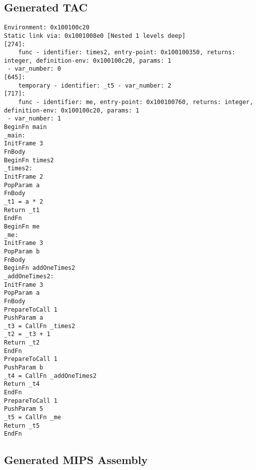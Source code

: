 \subsection{Generated TAC}
\begin{verbatim}
Environment: 0x100100c20
Static link via: 0x1001008e0 [Nested 1 levels deep]
[274]:
	func - identifier: times2, entry-point: 0x100100350, returns: integer, definition-env: 0x100100c20, params: 1
 - var_number: 0
[645]:
	temporary - identifier: _t5 - var_number: 2
[717]:
	func - identifier: me, entry-point: 0x100100760, returns: integer, definition-env: 0x100100c20, params: 1
 - var_number: 1
BeginFn main
_main:
InitFrame 3
FnBody
BeginFn times2
_times2:
InitFrame 2
PopParam a
FnBody
_t1 = a * 2
Return _t1
EndFn
BeginFn me
_me:
InitFrame 3
PopParam b
FnBody
BeginFn addOneTimes2
_addOneTimes2:
InitFrame 3
PopParam a
FnBody
PrepareToCall 1
PushParam a
_t3 = CallFn _times2
_t2 = _t3 + 1
Return _t2
EndFn
PrepareToCall 1
PushParam b
_t4 = CallFn _addOneTimes2
Return _t4
EndFn
PrepareToCall 1
PushParam 5
_t5 = CallFn _me
Return _t5
EndFn
\end{verbatim}\subsection{Generated MIPS Assembly}
